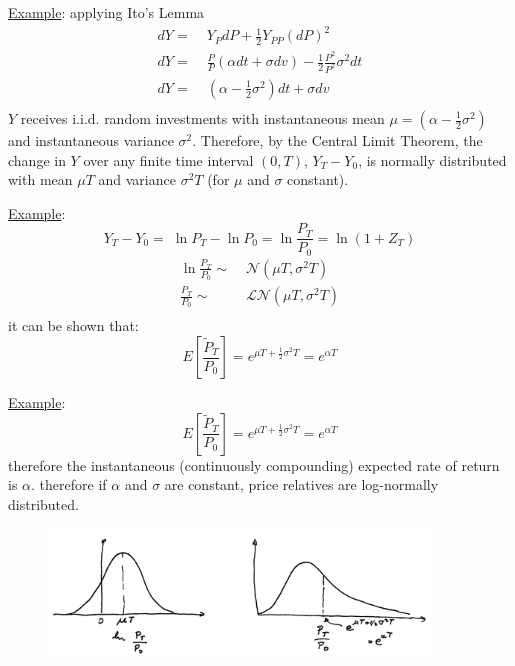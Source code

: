 \documentclass[
14pt,notheorems,hyperref={pdfauthor=whatever}
]{beamer}
\begin{document}
\begin{frame}
\underline{Example}: applying Ito's Lemma
\begin{align*}
    dY =&\; Y_P dP + \frac{1}{2} Y_{PP} (dP)^2\\
    dY =&\; \frac{P}{P}(\alpha dt + \sigma dv)-\frac{1}{2} \frac{P^2}{P^2} \sigma^2 dt\\
    dY =&\; (\alpha - \frac{1}{2}\sigma^2)dt + \sigma dv\\
\end{align*}
$Y$ receives i.i.d. random investments with instantaneous mean $\mu = (\alpha - \frac{1}{2}\sigma^2)$ and instantaneous variance $\sigma^2$.
Therefore, by the Central Limit Theorem, the change in $Y$ over any finite time interval $(0,T)$, $Y_T-Y_0$, is normally distributed with mean $\mu T$ and variance $\sigma^2 T$ (for $\mu$ and $\sigma$ constant).
\end{frame}

\begin{frame}
\underline{Example}: 
\[Y_T - Y_0 = \; \ln{P_T} - \ln{P_0} = \ln{\frac{P_T}{P_0}} = \ln{(1+Z_T)}\]
\begin{align*}
    \ln{\frac{P_T}{P_0}} \sim &\; \mathcal{N}(\mu T, \sigma^2 T)\\
    \frac{P_T}{P_0} \sim &\; \mathcal{LN}(\mu T, \sigma^2 T)\\
\end{align*}
it can be shown that:
\[E[\frac{\tilde P_T}{P_0}]=e^{\mu T +\frac{1}{2}\sigma^2T} = e^{\alpha T}\]
\end{frame}

\begin{frame}
\underline{Example}: 
\[E[\frac{\tilde P_T}{P_0}]=e^{\mu T +\frac{1}{2}\sigma^2T} = e^{\alpha T}\]
therefore the instantaneous (continuously compounding) expected rate of return is $\alpha$.
therefore if $\alpha$ and $\sigma$ are constant, price relatives are log-normally distributed.
\begin{figure}[diffusion]
    \includegraphics[width=0.9\textwidth]{images/L8-lognormal.png}
    \centering
\end{figure}
\end{frame}
\end{document}
